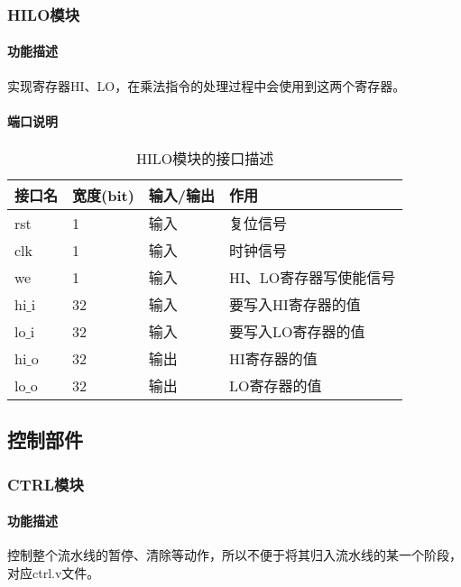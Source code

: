 \subsubsection{HILO模块}
\paragraph{功能描述}
\quad

\quad

实现寄存器HI、LO，在乘法指令的处理过程中会使用到这两个寄存器。
\paragraph{端口说明}
\quad

\quad
\begin{table}[H]
	\centering
	\caption{HILO模块的接口描述}
	\begin{tabular}{|l|l|l|l|}
		\hline
		接口名 & 宽度(bit) & 输入/输出 & 作用 \\
		\hline
		rst & 1 & 输入 & 复位信号 \\
		\hline
		clk & 1 & 输入 & 时钟信号 \\
		\hline
		we & 1 & 输入 & HI、LO寄存器写使能信号 \\
		\hline
		hi$\_$i & 32 & 输入 & 要写入HI寄存器的值 \\
		\hline
		lo$\_$i & 32 & 输入 & 要写入LO寄存器的值 \\
		\hline
		hi$\_$o & 32 & 输出 & HI寄存器的值 \\
		\hline
		lo$\_$o & 32 & 输出 & LO寄存器的值 \\
		\hline
	\end{tabular}
\end{table}
\subsection{控制部件}
\subsubsection{CTRL模块}
\paragraph{功能描述}
\quad

\quad

控制整个流水线的暂停、清除等动作，所以不便于将其归入流水线的某一个阶段，对应ctrl.v文件。

